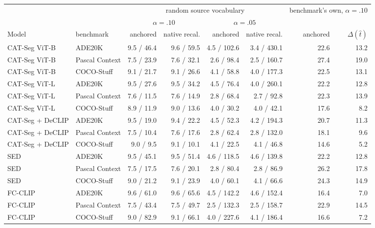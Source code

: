\begin{tabular}{@{}llrrrrrr@{}}
\toprule
& & \multicolumn{4}{c}{random source vocabulary} & \multicolumn{2}{c}{benchmark\rq{}s own, $\alpha=.10$} \\
\cmidrule(lr){3-6}\cmidrule(l){7-8}
& & \multicolumn{2}{c}{$\alpha=.10$} & \multicolumn{2}{c}{$\alpha=.05$} & & \\
\cmidrule(lr){3-4}\cmidrule(lr){5-6}
Model & benchmark & anchored & native recal. & anchored & native recal. & anchored & $\Delta(\hat t)$ \\
\midrule
CAT-Seg ViT-B & ADE20K & 9.5 / 46.4 & 9.6 / 59.5 & 4.5 / 102.6 & 3.4 / 430.1 & 22.6 & 13.2 \\
CAT-Seg ViT-B & Pascal Context & 7.5 / 23.9 & 7.6 / 32.1 & 2.6 / 98.4 & 2.5 / 160.7 & 27.4 & 19.0 \\
CAT-Seg ViT-B & COCO-Stuff & 9.1 / 21.7 & 9.1 / 26.6 & 4.1 / 58.8 & 4.0 / 177.3 & 22.5 & 13.1 \\
CAT-Seg ViT-L & ADE20K & 9.5 / 27.6 & 9.5 / 34.2 & 4.5 / 76.4 & 4.0 / 260.1 & 22.2 & 12.8 \\
CAT-Seg ViT-L & Pascal Context & 7.6 / 11.5 & 7.6 / 14.9 & 2.8 / 68.4 & 2.7 / 92.8 & 22.3 & 13.9 \\
CAT-Seg ViT-L & COCO-Stuff & 8.9 / 11.9 & 9.0 / 13.6 & 4.0 / 30.2 & 4.0 / 42.1 & 17.6 & 8.2 \\
CAT-Seg + DeCLIP & ADE20K & 9.5 / 19.0 & 9.4 / 22.2 & 4.5 / 52.3 & 4.2 / 194.3 & 20.7 & 11.3 \\
CAT-Seg + DeCLIP & Pascal Context & 7.5 / 10.4 & 7.6 / 17.6 & 2.8 / 62.4 & 2.8 / 132.0 & 18.1 & 9.6 \\
CAT-Seg + DeCLIP & COCO-Stuff & 9.0 / 9.5 & 9.1 / 10.1 & 4.1 / 22.5 & 4.1 / 46.8 & 14.6 & 5.2 \\
SED & ADE20K & 9.5 / 45.1 & 9.5 / 51.4 & 4.6 / 118.5 & 4.6 / 139.8 & 22.2 & 12.8 \\
SED & Pascal Context & 7.5 / 17.5 & 7.6 / 20.1 & 2.8 / 80.4 & 2.8 / 86.9 & 26.2 & 17.8 \\
SED & COCO-Stuff & 9.0 / 21.2 & 9.1 / 23.9 & 4.0 / 60.1 & 4.1 / 66.6 & 24.3 & 14.9 \\
FC-CLIP & ADE20K & 9.6 / 61.0 & 9.6 / 65.6 & 4.5 / 142.2 & 4.6 / 152.4 & 16.4 & 7.0 \\
FC-CLIP & Pascal Context & 7.5 / 43.4 & 7.5 / 49.7 & 2.5 / 132.3 & 2.5 / 158.7 & 22.9 & 14.5 \\
FC-CLIP & COCO-Stuff & 9.0 / 82.9 & 9.1 / 66.1 & 4.0 / 227.6 & 4.1 / 186.4 & 16.6 & 7.2 \\
\bottomrule
\end{tabular}

